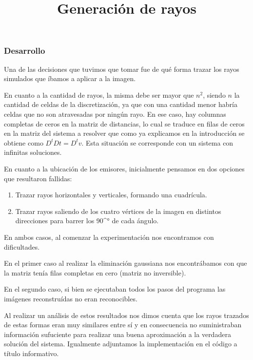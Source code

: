 \subsubsection*{Desarrollo}

\title{Generación de rayos}

\par Una de las decisiones que tuvimos que tomar fue de qué forma trazar los rayos simulados que íbamos a aplicar a la imagen.

\par En cuanto a la cantidad de rayos, la misma debe ser mayor que $n^{2}$, siendo $n$ la cantidad de celdas de la discretización, ya que con una cantidad menor habría celdas que no son atravesadas por ningún rayo. En ese caso, hay columnas completas de ceros en la matriz de distancias, lo cual se traduce en filas de ceros en la matriz del sistema a resolver que como ya explicamos en la introducción se obtiene como $D^{t}D t = D^{t} v$. Esta situación se corresponde con un sistema con infinitas soluciones.

\par En cuanto a la ubicación de los emisores, inicialmente pensamos en dos opciones que resultaron fallidas:
\begin{enumerate}
\item Trazar rayos horizontales y verticales, formando una cuadrícula.
\item Trazar rayos saliendo de los cuatro vértices de la imagen en distintos direcciones para barrer los 90^{°} de cada ángulo.
\end{enumerate}

\par En ambos casos, al comenzar la experimentación nos encontramos con dificultades.

\par En el primer caso al realizar la eliminación gaussiana nos encontrábamos con que la matriz tenía filas completas en cero (matriz no inversible).

\par En el segundo caso, si bien se ejecutaban todos los pasos del programa las imágenes reconstruídas no eran reconocibles.

Al realizar un análisis de estos resultados nos dimos cuenta que los rayos trazados de estas formas eran muy similares entre sí y en consecuencia no suministraban información sufuciente para realizar una buena aproximación a la verdadera solución del sistema. Igualmente adjuntamos la implementación en el código a título informativo.

